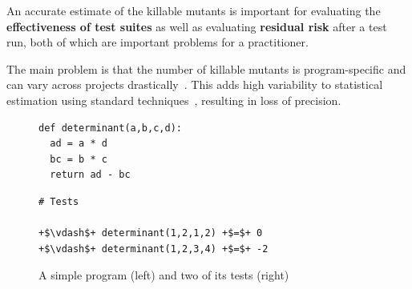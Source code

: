 \documentclass[sigconf,review,anonymous]{acmart}
\begin{document}
\begin{tcolorbox}[boxrule=0.5pt, arc=4pt, boxsep=0pt, width=\columnwidth]
An accurate estimate of the killable mutants is important for evaluating the \textbf{effectiveness
of test suites} as well as evaluating \textbf{residual risk} after a test run, both of which are important problems for a practitioner.
\end{tcolorbox}

The main problem is that the number of killable %
mutants is program-specific and can vary across projects drastically~\cite{offutt1994using,grun2009impact}. This adds high variability to statistical estimation using standard techniques~\cite{gotelli2011estimating}, resulting in loss of precision.

%
%

\begin{figure}[t]
\begin{minipage}{.45\columnwidth}  %
\begin{lstlisting}[style=python]
def determinant(a,b,c,d):
  ad = a * d
  bc = b * c
  return ad - bc
\end{lstlisting}
\end{minipage}
\hfill
\begin{minipage}{0.5\columnwidth} %
\begin{lstlisting}[style=python,escapechar=+, numbers=none]
# Tests

+$\vdash$+ determinant(1,2,1,2) +$=$+ 0
+$\vdash$+ determinant(1,2,3,4) +$=$+ -2
\end{lstlisting}
\end{minipage}
\caption{A simple program (left) and two of its tests (right)}
\label{fig:working-example}
\end{figure}
\end{document}
